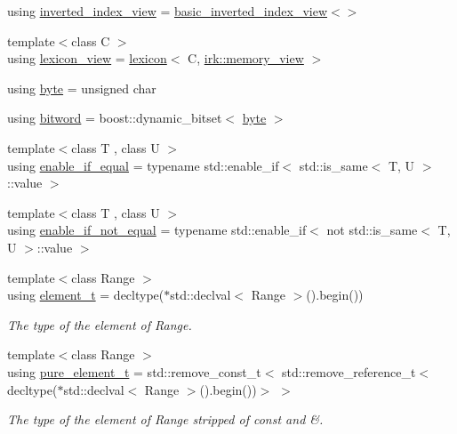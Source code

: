 \begin{DoxyCompactItemize}
\item 
using \mbox{\hyperlink{namespaceirk_a137711df98ba695c3526ba4004853a47}{inverted\+\_\+index\+\_\+view}} = \mbox{\hyperlink{classirk_1_1basic__inverted__index__view}{basic\+\_\+inverted\+\_\+index\+\_\+view}}$<$$>$
\item 
{\footnotesize template$<$class C $>$ }\\using \mbox{\hyperlink{namespaceirk_ab1814afdb97c1b326d1d549beedf9be8}{lexicon\+\_\+view}} = \mbox{\hyperlink{classirk_1_1lexicon}{lexicon}}$<$ C, \mbox{\hyperlink{classirk_1_1memory__view}{irk\+::memory\+\_\+view}} $>$
\item 
using \mbox{\hyperlink{namespaceirk_a332c28497c23c3702c56f3c1c100d028}{byte}} = unsigned char
\item 
using \mbox{\hyperlink{namespaceirk_a5d1a67079cf6423ecaededebe848f083}{bitword}} = boost\+::dynamic\+\_\+bitset$<$ \mbox{\hyperlink{namespaceirk_a332c28497c23c3702c56f3c1c100d028}{byte}} $>$
\item 
{\footnotesize template$<$class T , class U $>$ }\\using \mbox{\hyperlink{namespaceirk_a57b757ac14c20845b38f720c2ad8e822}{enable\+\_\+if\+\_\+equal}} = typename std\+::enable\+\_\+if$<$ std\+::is\+\_\+same$<$ T, U $>$\+::value $>$
\item 
{\footnotesize template$<$class T , class U $>$ }\\using \mbox{\hyperlink{namespaceirk_a4a138aaf92a8812dae06fe222084c969}{enable\+\_\+if\+\_\+not\+\_\+equal}} = typename std\+::enable\+\_\+if$<$ not std\+::is\+\_\+same$<$ T, U $>$\+::value $>$
\item 
{\footnotesize template$<$class Range $>$ }\\using \mbox{\hyperlink{namespaceirk_a44ec708d671914dae1d40355ac05c280}{element\+\_\+t}} = decltype($\ast$std\+::declval$<$ Range $>$().begin())
\begin{DoxyCompactList}\small\item\em The type of the element of Range. \end{DoxyCompactList}\item 
{\footnotesize template$<$class Range $>$ }\\using \mbox{\hyperlink{namespaceirk_a1e48b43a3f40d553264380da5e7263c1}{pure\+\_\+element\+\_\+t}} = std\+::remove\+\_\+const\+\_\+t$<$ std\+::remove\+\_\+reference\+\_\+t$<$ decltype($\ast$std\+::declval$<$ Range $>$().begin())$>$ $>$
\begin{DoxyCompactList}\small\item\em The type of the element of Range stripped of {\ttfamily const} and {\ttfamily \&}. \end{DoxyCompactList}\item 
$$
\end{DoxyCompactItemize}
